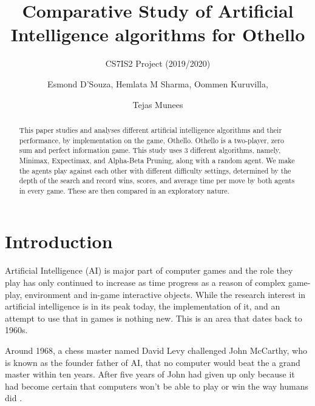 \documentclass{svproc}
\begin{document}
\mainmatter
\title{Comparative Study of Artificial Intelligence algorithms for Othello
}
\subtitle{CS7IS2 Project (2019/2020)}
\author{Esmond D'Souza, Hemlata M Sharma, Oommen Kuruvilla, \and Tejas Munees}


\maketitle              %

\begin{abstract}
This paper studies and analyses different artificial intelligence algorithms and their performance, by implementation on the game, Othello. Othello is a two-player, zero sum and perfect information game. This study uses 3 different algorithms, namely, Minimax, Expectimax, and Alpha-Beta Pruning, along with a random agent. We make the agents play against each other with different difficulty settings, determined by the depth of the search and record wins, scores, and average time per move by both agents in every game. These are then compared in an exploratory nature.

\end{abstract}
%

\section{Introduction}

Artificial Intelligence (AI) is major part of computer games and the role they play has only continued to increase as time progress as a reason of complex game-play, environment and in-game interactive objects. While the research interest in artificial intelligence is in its peak today, the implementation of it, and an attempt to use that in games is nothing new. This is an area that dates back to 1960s.

Around 1968, a chess master named David Levy challenged John McCarthy, who is known as the founder father of AI, that no computer would beat the a grand master within ten years. After five years of John had given up only because it had become certain that computers won't be able to play or win the way humans did \cite{MIT_lecture}.
\end{document}
